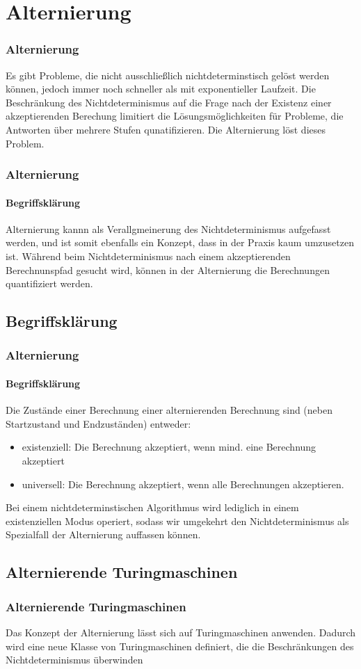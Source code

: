 \section{Alternierung}

\begin{frame}
    \frametitle{Alternierung}
    Es gibt Probleme, die nicht ausschließlich nichtdeterminstisch gelöst werden können, jedoch immer noch schneller als mit exponentieller Laufzeit.
    Die Beschränkung des Nichtdeterminismus auf die Frage nach der Existenz einer akzeptierenden Berechung limitiert die Lösungsmöglichkeiten für Probleme,
    die Antworten über mehrere Stufen qunatifizieren. Die Alternierung löst dieses Problem.
\end{frame}

\begin{frame}
    \frametitle{Alternierung}
    \framesubtitle{Begriffsklärung}
    Alternierung kannn als Verallgmeinerung des Nichtdeterminismus aufgefasst werden, und ist somit ebenfalls ein Konzept, dass in der Praxis kaum umzusetzen ist.
    Während beim Nichtdeterminismus nach einem akzeptierenden Berechnunspfad gesucht wird, können in der Alternierung die Berechnungen quantifiziert werden.
\end{frame}

\subsection{Begriffsklärung}
\begin{frame}
    \frametitle{Alternierung}
    \framesubtitle{Begriffsklärung}
    Die Zustände einer Berechnung einer alternierenden Berechnung sind (neben Startzustand und Endzuständen) entweder:
    \begin{itemize}
        \item existenziell: Die Berechnung akzeptiert, wenn mind. eine Berechnung akzeptiert
        \item universell: Die Berechnung akzeptiert, wenn alle Berechnungen akzeptieren.
    \end{itemize}
    Bei einem nichtdeterminstischen Algorithmus wird lediglich in einem existenziellen Modus operiert,
    sodass wir umgekehrt den Nichtdeterminismus als Spezialfall der Alternierung auffassen können.

\end{frame}

\subsection{Alternierende Turingmaschinen}
\begin{frame}
    \frametitle{Alternierende Turingmaschinen}
    Das Konzept der Alternierung lässt sich auf Turingmaschinen anwenden. 
    Dadurch wird eine neue Klasse von Turingmaschinen definiert, die die Beschränkungen des
    Nichtdeterminismus überwinden
\end{frame}

